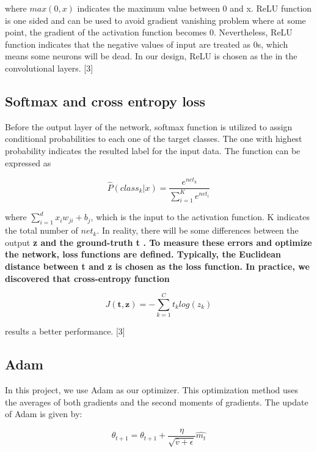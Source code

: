 \documentclass[twoside,twocolumn]{article}
\begin{document}
\noindent where $max(0,x)$ indicates the maximum value between 0 and x. ReLU function is one sided and can be used to avoid gradient vanishing problem where at some point, the gradient of the activation function becomes 0. Nevertheless, ReLU function indicates that the negative values of input are treated as 0s, which means some neurons will be dead. In our design, ReLU is chosen as the in the convolutional layers. [3]

\subsection{Softmax and cross entropy loss}

Before the output layer of the network, softmax function is utilized to assign conditional probabilities to each one of 
the target classes. The one with highest probability indicates the resulted label for the input data. The function can be expressed as 

\begin{equation}
\label{eq:2}
\widehat{P}(class_{k}|x)=\frac{e^{net_k}}{\sum_{i=1}^{K}e^{net_i}}
\end{equation}

\noindent where $\sum_{i=1}^{d}x_iw_{ji}+b_j$, which is the input to the activation function. K indicates the total number of $net_k$. In reality, there will be some differences between the output \bf z \rm and the ground-truth \bf t \rm. To measure these errors and optimize the network, loss functions are defined. Typically, the Euclidean distance between \bf t \rm and \bf z \rm is chosen as the loss function. In practice, we discovered that cross-entropy function 

\begin{equation}
\label{eq:3}
J(\mathbf{t,z})=-\sum_{k=1}^{C}t_klog(z_k)
\end{equation}

\noindent results a better performance. [3]

\subsection{Adam}

In this project, we use Adam as our optimizer.  This optimization method uses the averages of both gradients and the second moments of gradients. The update of Adam is given by: 

\begin{equation}
\label{eq:4}
\theta _{t+1}=\theta_{t+1}+\frac{\eta}{\sqrt{\hat{v}+\epsilon }}\widehat{m_t}
\end{equation}
\end{document}
